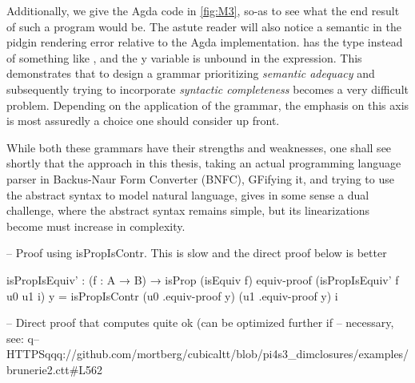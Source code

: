 

Additionally, we give the Agda code in \autoref{fig:M3}, so-as to see what the
end result of such a program would be. The astute reader will also notice a
semantic in the pidgin rendering error relative to the Agda implementation.
 has the type  instead of something like
, and the y variable is unbound in the 
expression. This demonstrates that to design a grammar prioritizing
\emph{semantic adequacy} and subsequently trying to incorporate \emph{syntactic
completeness} becomes a very difficult problem. Depending on the application of
the grammar, the emphasis on this axis is most assuredly a choice one should
consider up front.

While both these grammars have their strengths and weaknesses, one shall see
shortly that the approach in this thesis, taking an actual programming language
parser in Backus-Naur Form Converter (BNFC), GFifying it, and trying to use the
abstract syntax to model natural language, gives in some sense a dual challenge,
where the abstract syntax remains simple, but its linearizations become
must increase in complexity.

-- Proof using isPropIsContr. This is slow and the direct proof below is better

isPropIsEquiv' : (f : A → B) → isProp (isEquiv f)
equiv-proof (isPropIsEquiv' f u0 u1 i) y =
  isPropIsContr (u0 .equiv-proof y) (u1 .equiv-proof y) i

-- Direct proof that computes quite ok (can be optimized further if
-- necessary, see:
q-- HTTPSqqq://github.com/mortberg/cubicaltt/blob/pi4s3_dimclosures/examples/brunerie2.ctt#L562









